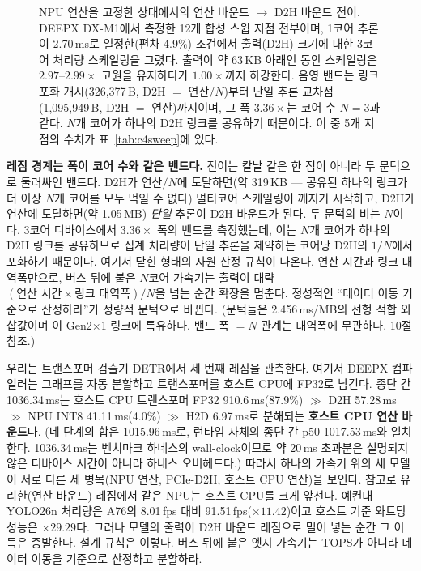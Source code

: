 \documentclass[11pt]{article}
\begin{document}
\begin{figure}[htbp]
\begin{tikzpicture}[x=1cm,y=1cm]
\end{tikzpicture}
\caption{NPU 연산을 고정한 상태에서의 연산 바운드 $\to$ D2H 바운드 전이. DEEPX DX-M1에서 측정한 12개 합성 스윕 지점 전부이며, 1코어 추론이 2.70\,ms로 일정한(편차 4.9\%) 조건에서 출력(D2H) 크기에 대한 3코어 처리량 스케일링을 그렸다. 출력이 약 63\,KB 아래인 동안 스케일링은 $2.97$--$2.99\times$ 고원을 유지하다가 $1.00\times$까지 하강한다. 음영 밴드는 링크 포화 개시(326{,}377\,B, D2H $=$ 연산$/N$)부터 단일 추론 교차점(1{,}095{,}949\,B, D2H $=$ 연산)까지이며, 그 폭 $3.36\times$는 코어 수 $N=3$과 같다. $N$개 코어가 하나의 D2H 링크를 공유하기 때문이다. 이 중 5개 지점의 수치가 표~\ref{tab:c4sweep}에 있다.}
\label{fig:c4}
\end{figure}

\textbf{레짐 경계는 폭이 코어 수와 같은 밴드다.} 전이는 칼날 같은 한 점이 아니라 두 문턱으로 둘러싸인 밴드다. D2H가 연산$/N$에 도달하면(약 319\,KB --- 공유된 하나의 링크가 더 이상 $N$개 코어를 모두 먹일 수 없다) 멀티코어 스케일링이 깨지기 시작하고, D2H가 연산에 도달하면(약 1.05\,MB) \emph{단일} 추론이 D2H 바운드가 된다. 두 문턱의 비는 $N$이다. 3코어 디바이스에서 $3.36\times$ 폭의 밴드를 측정했는데, 이는 $N$개 코어가 하나의 D2H 링크를 공유하므로 집계 처리량이 단일 추론을 제약하는 코어당 D2H의 $1/N$에서 포화하기 때문이다. 여기서 닫힌 형태의 자원 산정 규칙이 나온다. 연산 시간과 링크 대역폭만으로, 버스 뒤에 붙은 $N$코어 가속기는 출력이 대략 $(\text{연산 시간} \times \text{링크 대역폭})/N$을 넘는 순간 확장을 멈춘다. 정성적인 ``데이터 이동 기준으로 산정하라''가 정량적 문턱으로 바뀐다. (문턱들은 2.456\,ms/MB의 선형 적합 외삽값이며 이 Gen2$\times$1 링크에 특유하다. 밴드 폭 $=N$ 관계는 대역폭에 무관하다. 10절 참조.)

우리는 트랜스포머 검출기 DETR에서 세 번째 레짐을 관측한다. 여기서 DEEPX 컴파일러는 그래프를 자동 분할하고 트랜스포머를 호스트 CPU에 FP32로 남긴다. 종단 간 1036.34\,ms는 호스트 CPU 트랜스포머 FP32 910.6\,ms(87.9\%) $\gg$ D2H 57.28\,ms $\gg$ NPU INT8 41.11\,ms(4.0\%) $\gg$ H2D 6.97\,ms로 분해되는 \textbf{호스트 CPU 연산 바운드}다. (네 단계의 합은 1015.96\,ms로, 런타임 자체의 종단 간 p50 1017.53\,ms와 일치한다. 1036.34\,ms는 벤치마크 하네스의 wall-clock이므로 약 20\,ms 초과분은 설명되지 않은 디바이스 시간이 아니라 하네스 오버헤드다.) 따라서 하나의 가속기 위의 세 모델이 서로 다른 세 병목(NPU 연산, PCIe-D2H, 호스트 CPU 연산)을 보인다. 참고로 유리한(연산 바운드) 레짐에서 같은 NPU는 호스트 CPU를 크게 앞선다. 예컨대 YOLO26n 처리량은 A76의 8.01\,fps 대비 91.51\,fps($\times11.42$)이고 호스트 기준 와트당 성능은 $\times29.29$다. 그러나 모델의 출력이 D2H 바운드 레짐으로 밀어 넣는 순간 그 이득은 증발한다. 설계 규칙은 이렇다. 버스 뒤에 붙은 엣지 가속기는 TOPS가 아니라 데이터 이동을 기준으로 산정하고 분할하라.
\end{document}
